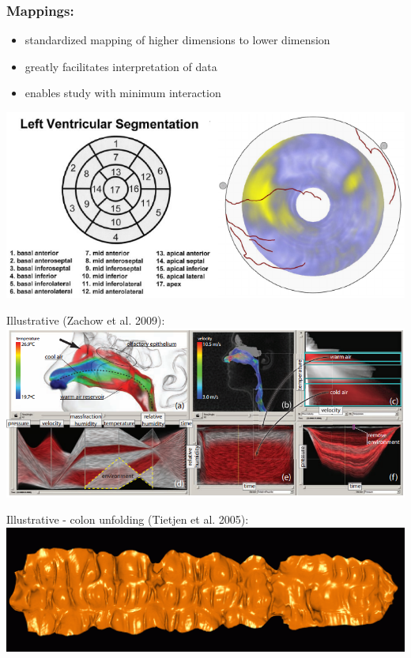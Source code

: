 \documentclass{beamer}
\begin{document}
\begin{frame}
	\frametitle{Mappings:}
	\begin{itemize}
		\item standardized mapping of higher dimensions to lower dimension
		\item greatly facilitates interpretation of data
		\item enables study with minimum interaction
	\end{itemize}
	\includegraphics[width=\textwidth]{images/heart}
\end{frame}

\begin{frame}
	Illustrative (Zachow et al. 2009):
	\includegraphics[width=\textwidth]{images/nose}
\end{frame}

\begin{frame}
	Illustrative - colon unfolding (Tietjen et al. 2005):
	\includegraphics[width=\textwidth]{images/colon}
\end{frame}
\end{document}
